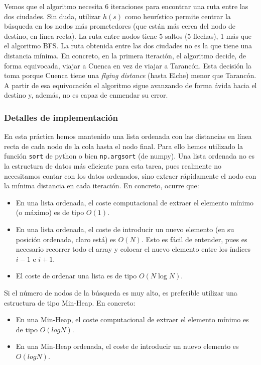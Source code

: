 \documentclass{article}
\begin{document}
Vemos que el algoritmo necesita 6 iteraciones para encontrar una ruta entre las dos ciudades. Sin duda,
utilizar $h(s)$ como heurístico permite centrar la búsqueda en los
nodos más prometedores (que están más cerca del nodo de destino, en línea recta). La ruta entre nodos tiene 5 saltos
(5 flechas), 1 más que el algoritmo BFS. La ruta obtenida entre las dos ciudades no es la que tiene una distancia mínima. En concreto, en la primera iteración, el algoritmo decide, de forma equivocada, viajar a Cuenca en vez de viajar a Tarancón. Esta decisión la toma porque Cuenca tiene una \textit{flying distance} (hasta Elche) menor que Tarancón. A partir de esa equivocación el algoritmo sigue avanzando de forma ávida hacia el destino y, además, no es capaz de enmendar su error.

\subsubsection{Detalles de implementación}
En esta práctica hemos mantenido una lista ordenada con las distancias en línea recta de cada nodo de la cola hasta el nodo final. Para ello hemos utilizado la función \texttt{sort} de python o bien \texttt{np.argsort} (de numpy). Una lista ordenada no es la estructura de datos más eficiente para esta tarea, pues realmente no necesitamos contar con los datos ordenados, sino extraer rápidamente el nodo con la mínima distancia en cada iteración. En concreto, ocurre que:
\begin{itemize}
    \item En una lista ordenada, el coste computacional de extraer el elemento mínimo (o máximo) es de tipo $O(1)$.
    \item En una lista ordenada, el coste de introducir un nuevo elemento (en su posición ordenada, claro está) es $O(N)$. Esto es fácil de entender, pues es necesario recorrer todo el array y colocar el nuevo elemento entre los índices $i-1$ e $i+1$.
    \item El coste de ordenar una lista es de tipo $O(N \log N)$.    
\end{itemize}

Si el número de nodos de la búsqueda es muy alto, es preferible utilizar una estructura de tipo Min-Heap. En concreto: 
\begin{itemize}
    \item En una Min-Heap, el coste computacional de extraer el elemento mínimo es de tipo $O(logN)$.
    \item En una Min-Heap ordenada, el coste de introducir un nuevo elemento es $O(logN)$.    
\end{itemize}
\end{document}

